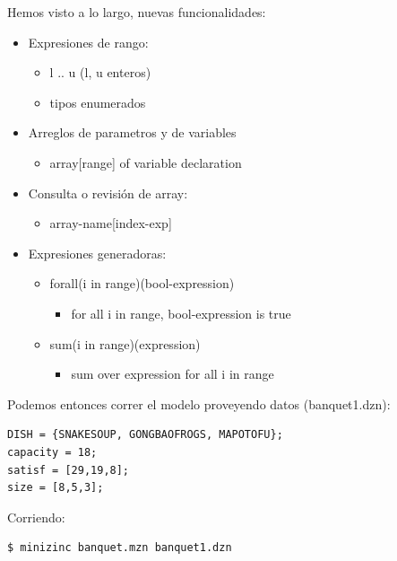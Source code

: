 \documentclass[12pt]{article}
\begin{document}
\begin{justify}
Hemos visto a lo largo, nuevas funcionalidades:
\end{justify}

\begin{itemize}
\item Expresiones de rango:
\begin{itemize}
\item l .. u (l, u enteros)
\item tipos enumerados
\end{itemize}
\item Arreglos de parametros y de variables
\begin{itemize}
\item array[range] of variable declaration
\end{itemize}
\item Consulta o revisión de array:
\begin{itemize}
\item array-name[index-exp]
\end{itemize}
\item Expresiones generadoras:
\begin{itemize}
\item forall(i in range)(bool-expression)
\begin{itemize}
\item for all i in range, bool-expression is true
\end{itemize}
\item sum(i in range)(expression)
\begin{itemize}
\item sum over expression for all i in range
\end{itemize}
\end{itemize}
\end{itemize}

\begin{justify}
Podemos entonces correr el modelo proveyendo datos (banquet1.dzn):
\end{justify}

\begin{Verbatim}
DISH = {SNAKESOUP, GONGBAOFROGS, MAPOTOFU};
capacity = 18;
satisf = [29,19,8];
size = [8,5,3];
\end{Verbatim}

\begin{justify}
Corriendo:
\end{justify}

\begin{Verbatim}
$ minizinc banquet.mzn banquet1.dzn
\end{Verbatim}
\end{document}
